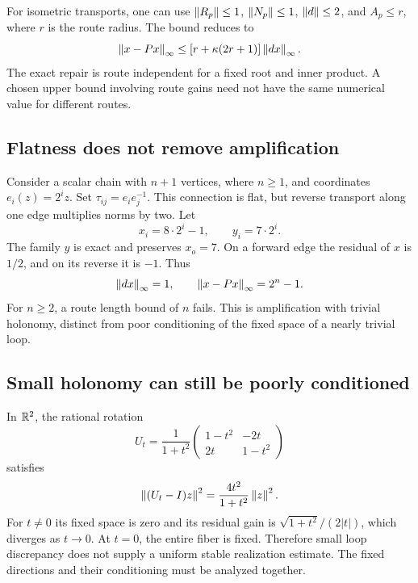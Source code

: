 For isometric transports, one can use \(\left\lVert R_p\right\rVert\le1\), \(\left\lVert N_p\right\rVert\le1\), \(\left\lVert d\right\rVert\le2\), and \(A_p\le r\), where \(r\) is the route radius. The bound reduces to
\[
 \left\lVert x-Px\right\rVert_\infty\le[r+\kappa(2r+1)]\left\lVert dx\right\rVert_\infty.
\]
The exact repair is route independent for a fixed root and inner product. A chosen upper bound involving route gains need not have the same numerical value for different routes.

\subsection{Flatness does not remove amplification}
Consider a scalar chain with \(n+1\) vertices, where \(n\ge1\), and coordinates \(e_i(z)=2^iz\). Set \(\tau_{ij}=e_ie_j^{-1}\). This connection is flat, but reverse transport along one edge multiplies norms by two. Let
\[
 x_i=8\cdot2^i-1,\qquad y_i=7\cdot2^i.
\]
The family \(y\) is exact and preserves \(x_o=7\). On a forward edge the residual of \(x\) is \(1/2\), and on its reverse it is \(-1\). Thus
\[
 \left\lVert dx\right\rVert_\infty=1,\qquad
 \left\lVert x-Px\right\rVert_\infty=2^n-1.
\]
For \(n\ge2\), a route length bound of \(n\) fails. This is amplification with trivial holonomy, distinct from poor conditioning of the fixed space of a nearly trivial loop.

\subsection{Small holonomy can still be poorly conditioned}
In \(\mathbb R^2\), the rational rotation
\[
 U_t=\frac1{1+t^2}
 \begin{pmatrix}1-t^2&-2t\\2t&1-t^2\end{pmatrix}
\]
satisfies
\[
 \left\lVert(U_t-I)z\right\rVert^2=\frac{4t^2}{1+t^2}\left\lVert z\right\rVert^2.
\]
For \(t\ne0\) its fixed space is zero and its residual gain is \(\sqrt{1+t^2}/(2|t|)\), which diverges as \(t\to0\). At \(t=0\), the entire fiber is fixed. Therefore small loop discrepancy does not supply a uniform stable realization estimate. The fixed directions and their conditioning must be analyzed together.

\label{sec:quantitative}
